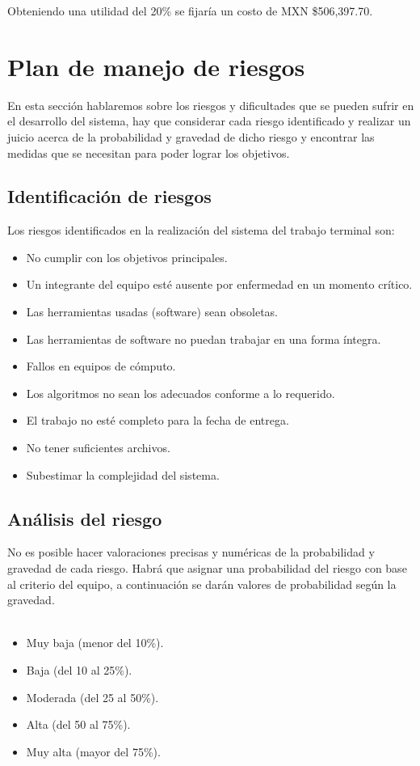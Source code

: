\documentclass[12pt]{report}
\begin{document}
Obteniendo una utilidad del 20\% se fijaría un costo de MXN \$506,397.70.


\section{Plan de manejo de riesgos}
En esta sección hablaremos sobre los riesgos y dificultades que se pueden sufrir en el desarrollo del sistema, hay que considerar cada riesgo identificado y realizar un juicio acerca de la probabilidad y gravedad de dicho riesgo y encontrar las medidas que se necesitan para poder lograr los objetivos.\\

\subsection{Identificación de riesgos}
Los riesgos identificados en la realización del sistema del trabajo terminal son:
\begin{itemize}
\item No cumplir con los objetivos principales.
\item Un integrante del equipo esté ausente por enfermedad en un momento crítico.
\item Las herramientas usadas (software) sean obsoletas.
\item Las herramientas de software no puedan trabajar en una forma íntegra.
\item Fallos en equipos de cómputo.
\item Los algoritmos no sean los adecuados conforme a lo requerido.
\item El trabajo no esté completo para la fecha de entrega.
\item No tener suficientes archivos.
\item Subestimar la complejidad del sistema.
\end{itemize}

\subsection{Análisis del riesgo}
No es posible hacer valoraciones precisas y numéricas de la probabilidad y gravedad de cada riesgo. Habrá que asignar una probabilidad del riesgo con base al criterio del equipo, a continuación se darán valores de probabilidad según la gravedad.\\\\
\begin{itemize}
\item Muy baja (menor del 10\%).
\item Baja (del 10 al 25\%).
\item Moderada (del 25 al 50\%).
\item Alta (del 50 al 75\%).
\item Muy alta (mayor del 75\%).
\end{itemize}
\end{document}
